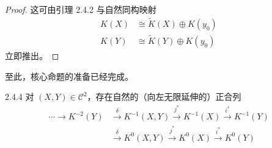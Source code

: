\begin{proof}
  这可由引理 2.4.2 与自然同构映射
  \[
  \begin{aligned}
  K(X)&\cong\tilde K(X)\oplus K(y_0)\\
  K(Y)&\cong\tilde K(Y)\oplus K(y_0)
  \end{aligned}
  \]
  立即推出。
\end{proof}

至此，核心命题的准备已经完成。

\begin{proposition*}{2.4.4}
  对 $(X,Y)\in\mathcal{C}^2$，存在自然的（向左无限延伸的）正合列
  \[
  \begin{aligned}
  \cdots\longrightarrow K^{-2}(Y)&\xrightarrow{\ \delta\ }K^{-1}(X,Y)
  \xrightarrow{j^*}K^{-1}(X)\xrightarrow{i^*}K^{-1}(Y)\\
  &\xrightarrow{\ \delta\ }K^0(X,Y)\xrightarrow{j^*}K^0(X)\xrightarrow{i^*}K^0(Y)
  \end{aligned}
  \]
\end{proposition*}

